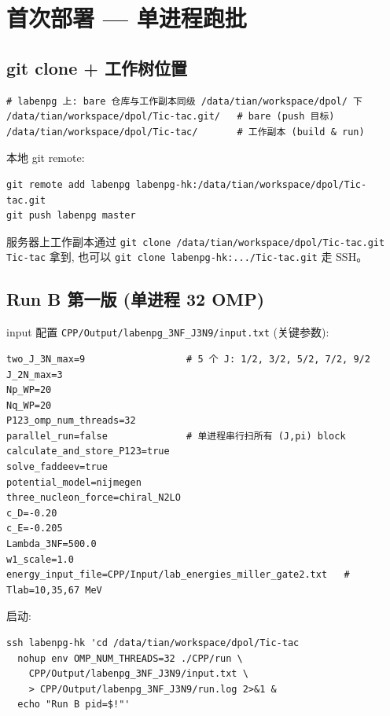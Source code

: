 \documentclass[11pt,a4paper]{article}
\begin{document}
\section{首次部署 — 单进程跑批}

\subsection{git clone + 工作树位置}

\begin{lstlisting}
# labenpg 上: bare 仓库与工作副本同级 /data/tian/workspace/dpol/ 下
/data/tian/workspace/dpol/Tic-tac.git/   # bare (push 目标)
/data/tian/workspace/dpol/Tic-tac/       # 工作副本 (build & run)
\end{lstlisting}

本地 git remote:
\begin{lstlisting}
git remote add labenpg labenpg-hk:/data/tian/workspace/dpol/Tic-tac.git
git push labenpg master
\end{lstlisting}

服务器上工作副本通过 \texttt{git clone /data/tian/workspace/dpol/Tic-tac.git Tic-tac}
拿到, 也可以 \texttt{git clone labenpg-hk:.../Tic-tac.git} 走 SSH。

\subsection{Run B 第一版 (单进程 32 OMP)}

input 配置 \texttt{CPP/Output/labenpg\_3NF\_J3N9/input.txt} (关键参数):

\begin{lstlisting}
two_J_3N_max=9                  # 5 个 J: 1/2, 3/2, 5/2, 7/2, 9/2
J_2N_max=3
Np_WP=20
Nq_WP=20
P123_omp_num_threads=32
parallel_run=false              # 单进程串行扫所有 (J,pi) block
calculate_and_store_P123=true
solve_faddeev=true
potential_model=nijmegen
three_nucleon_force=chiral_N2LO
c_D=-0.20
c_E=-0.205
Lambda_3NF=500.0
w1_scale=1.0
energy_input_file=CPP/Input/lab_energies_miller_gate2.txt   # Tlab=10,35,67 MeV
\end{lstlisting}

启动:
\begin{lstlisting}
ssh labenpg-hk 'cd /data/tian/workspace/dpol/Tic-tac
  nohup env OMP_NUM_THREADS=32 ./CPP/run \
    CPP/Output/labenpg_3NF_J3N9/input.txt \
    > CPP/Output/labenpg_3NF_J3N9/run.log 2>&1 &
  echo "Run B pid=$!"'
\end{lstlisting}
\end{document}
